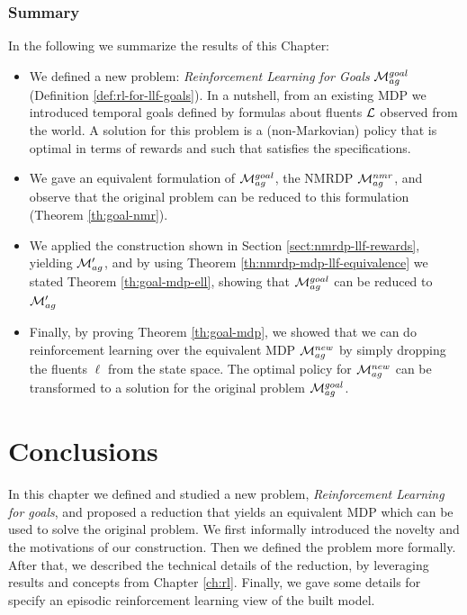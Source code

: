 \subsubsection{Summary}
In the following we summarize the results of this Chapter:
\begin{itemize}
	\item We defined a new problem: \emph{Reinforcement Learning for \LLf Goals} $\mathcal{M}_{ag}^{goal}$ (Definition \ref{def:rl-for-llf-goals}). In a nutshell, from an existing MDP we introduced temporal goals defined by \LLf formulas about fluents $\mathcal{L}$ observed from the world. A solution for this problem is a (non-Markovian) policy that is optimal in terms of rewards and such that satisfies the \LLf specifications.
	\item We gave an equivalent formulation of $\mathcal{M}_{ag}^{goal}$, the NMRDP $\mathcal{M}_{ag}^{nmr}$, and observe that the original problem can be reduced to this formulation (Theorem \ref{th:goal-nmr}).
	\item We applied the construction shown in Section \ref{sect:nmrdp-llf-rewards}, yielding $\mathcal{M}'_{ag}$, and by using Theorem \ref{th:nmrdp-mdp-llf-equivalence} we stated Theorem \ref{th:goal-mdp-ell}, showing that $\mathcal{M}_{ag}^{goal}$ can be reduced to $\mathcal{M}'_{ag}$
	\item Finally, by proving Theorem \ref{th:goal-mdp}, we showed that we can do reinforcement learning over the equivalent MDP $\mathcal{M}_{ag}^{new}$ by simply dropping the fluents $\ell$ from the state space. The optimal policy for $\mathcal{M}_{ag}^{new}$ can be transformed to a solution for the original problem $\mathcal{M}_{ag}^{goal}$.
\end{itemize}

\section{Conclusions}
In this chapter we defined and studied a new problem, \emph{Reinforcement Learning for \LLf goals}, and proposed a reduction that yields an equivalent MDP which can be used to solve the original problem. We first informally introduced the novelty and the motivations of our construction. Then we defined the problem more formally. After that, we described the technical details of the reduction, by leveraging results and concepts from Chapter \ref{ch:rl}. Finally, we gave some details for specify an episodic reinforcement learning view of the built model. 
